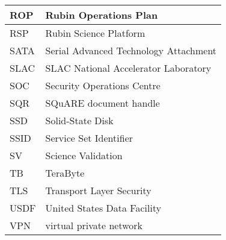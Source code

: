 \begin{longtable}{p{}p{}}
ROP & Rubin Operations Plan \\\hline
RSP & Rubin Science Platform \\\hline
SATA & Serial Advanced Technology Attachment \\\hline
SLAC & SLAC National Accelerator Laboratory \\\hline
SOC & Security Operations Centre \\\hline
SQR & SQuARE document handle \\\hline
SSD & Solid-State Disk \\\hline
SSID & Service Set Identifier \\\hline
SV & Science Validation \\\hline
TB & TeraByte \\\hline
TLS & Transport Layer Security \\\hline
USDF & United States Data Facility \\\hline
VPN & virtual private network \\\hline
\end{longtable}
